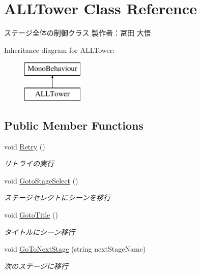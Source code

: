 \hypertarget{class_a_l_l_tower}{}\section{A\+L\+L\+Tower Class Reference}
\label{class_a_l_l_tower}


ステージ全体の制御クラス 製作者：冨田 大悟  


Inheritance diagram for A\+L\+L\+Tower\+:\begin{figure}[H]
\begin{center}
\leavevmode
\includegraphics[height=2.000000cm]{class_a_l_l_tower}
\end{center}
\end{figure}
\subsection*{Public Member Functions}
\begin{DoxyCompactItemize}
\item 
void \hyperlink{class_a_l_l_tower_a30b3b152a1444c0dd1f326ff4d4f6ede}{Retry} ()
\begin{DoxyCompactList}\small\item\em リトライの実行 \end{DoxyCompactList}\item 
void \hyperlink{class_a_l_l_tower_a75b8b5715175131c28e9e1a571e57521}{Goto\+Stage\+Select} ()
\begin{DoxyCompactList}\small\item\em ステージセレクトにシーンを移行 \end{DoxyCompactList}\item 
void \hyperlink{class_a_l_l_tower_a4ace44a9bb3967b4f8f7b534e5e2df40}{Goto\+Title} ()
\begin{DoxyCompactList}\small\item\em タイトルにシーン移行 \end{DoxyCompactList}\item 
void \hyperlink{class_a_l_l_tower_a02ad7d49b43a0d3466fe7aecc099bd4b}{Go\+To\+Next\+Stage} (string next\+Stage\+Name)
\begin{DoxyCompactList}\small\item\em 次のステージに移行 \end{DoxyCompactList}\end{DoxyCompactItemize}
